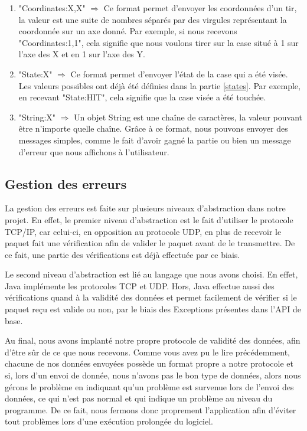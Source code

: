 			\begin{enumerate}
				\item "Coordinates:X,X" $\Rightarrow$ Ce format permet d'envoyer les coordonnées d'un tir, la valeur est une suite de nombres séparés par des virgules représentant la coordonnée sur un axe donné. Par exemple, si nous recevons "Coordinates:1,1", cela signifie que nous voulons tirer sur la case situé à 1 sur l'axe des X et en 1 sur l'axe des Y.
			 
				\item "State:X" $\Rightarrow$ Ce format permet d'envoyer l'état de la case qui a été visée. Les valeurs possibles ont déjà été définies dans la partie \ref{states}. Par exemple, en recevant "State:HIT", cela signifie que la case visée a été touchée.
				
				\item "String:X" $\Rightarrow$ Un objet String est une chaîne de caractères, la valeur pouvant être n'importe quelle chaîne. Grâce à ce format, nous pouvons envoyer des messages simples, comme le fait d'avoir gagné la partie ou bien un message d'erreur que nous affichons à l'utilisateur. 
				
			\end{enumerate}
			

\subsection{Gestion des erreurs}
	La gestion des erreurs est faite sur plusieurs niveaux d'abstraction dans notre projet. En effet, le premier niveau d'abstraction est le fait d'utiliser le protocole TCP/IP, car celui-ci, en opposition au protocole UDP, en plus de recevoir le paquet fait une vérification afin de valider le paquet avant de le transmettre. De ce fait, une partie des vérifications est déjà effectuée par ce biais.\newline
	
	Le second niveau d'abstraction est lié au langage que nous avons choisi. En effet, Java implémente les protocoles TCP et UDP. Hors, Java effectue aussi des vérifications quand à la validité des données et permet facilement de vérifier si le paquet reçu est valide ou non, par le biais des Exceptions présentes dans l'API de base.\newline
	
	Au final, nous avons implanté notre propre protocole de validité des données, afin d'être sûr de ce que nous recevons. Comme vous avez pu le lire précédemment, chacune de nos données envoyées possède un format propre a notre protocole et si, lors d'un envoi de donnée, nous n'avons pas le bon type de données, alors nous gérons le problème en indiquant qu'un problème est survenue lors de l'envoi des données, ce qui n'est pas normal et qui indique un problème au niveau du programme. De ce fait, nous fermons donc proprement l'application afin d'éviter tout problèmes lors d'une exécution prolongée du logiciel.\newline
	

